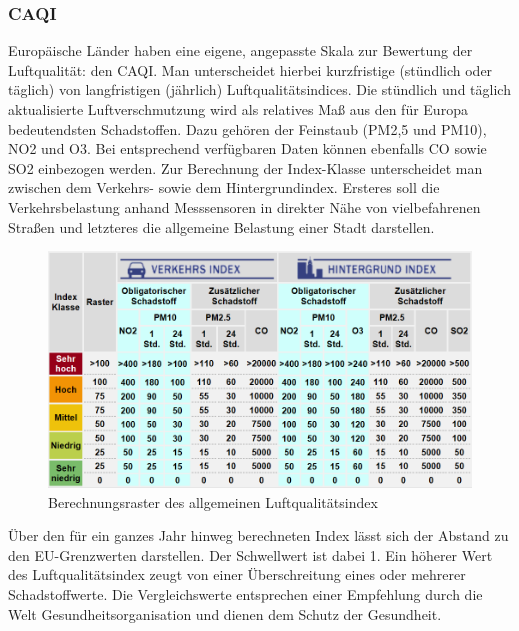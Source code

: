 \subsubsection{\acf{CAQI}}
Europäische Länder haben eine eigene, angepasste Skala zur Bewertung der Luftqualität: den \acf{CAQI}. Man unterscheidet hierbei kurzfristige (stündlich oder täglich) von langfristigen (jährlich) Luftqualitätsindices. 
Die stündlich und täglich aktualisierte Luftverschmutzung wird als relatives Maß aus den für Europa bedeutendsten Schadstoffen. Dazu gehören der Feinstaub (PM2,5 und PM10), \acs{NO2} und \acs{O3}. Bei entsprechend verfügbaren Daten können ebenfalls \acf{CO} sowie \acs{SO2} einbezogen werden. Zur Berechnung der Index-Klasse unterscheidet man zwischen dem Verkehrs- sowie dem Hintergrundindex. Ersteres soll die Verkehrsbelastung anhand Messsensoren in direkter Nähe von vielbefahrenen Straßen und letzteres die allgemeine Belastung einer Stadt darstellen. 
\newline
\begin{figure}[H]
	\centering
	\includegraphics[width=\textwidth]{images/CAQI.png}	
	\caption{Berechnungsraster des allgemeinen Luftqualitätsindex \cite{CAQI.Indices}}
	\label{fig:Raster_CAQI}
\end{figure}
Über den für ein ganzes Jahr hinweg berechneten Index lässt sich der Abstand zu den EU-Grenzwerten darstellen. Der Schwellwert ist dabei 1. Ein höherer Wert des Luftqualitätsindex zeugt von einer Überschreitung eines oder mehrerer Schadstoffwerte. Die Vergleichswerte entsprechen einer Empfehlung durch die Welt Gesundheitsorganisation und dienen dem Schutz der Gesundheit. \cite{CAQI.Indices} \cite{CAQI.AktuelleDaten}
\newline

